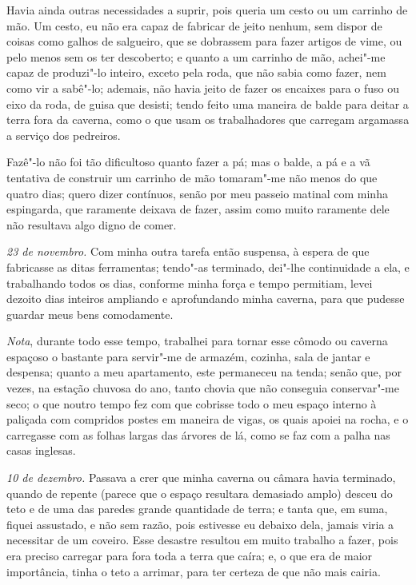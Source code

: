 Havia ainda outras necessidades a suprir, pois queria um cesto ou um
carrinho de mão. Um cesto, eu não era capaz de fabricar de jeito nenhum,
sem dispor de coisas como galhos de salgueiro, que se dobrassem para
fazer artigos de vime, ou pelo menos sem os ter descoberto; e quanto a
um carrinho de mão, achei"-me capaz de produzi"-lo inteiro, exceto pela
roda, que não sabia como fazer, nem como vir a sabê"-lo; ademais, não
havia jeito de fazer os encaixes para o fuso ou eixo da roda, de guisa
que desisti; tendo feito uma maneira de balde para deitar a terra fora
da caverna, como o que usam os trabalhadores que carregam argamassa a
serviço dos pedreiros.

Fazê"-lo não foi tão dificultoso quanto fazer a pá; mas o balde, a pá e a
vã tentativa de construir um carrinho de mão tomaram"-me não menos do que
quatro dias; quero dizer contínuos, senão por meu passeio matinal com
minha espingarda, que raramente deixava de fazer, assim como muito
raramente dele não resultava algo digno de comer.

\emph{23 de novembro.} Com minha outra tarefa então suspensa, à espera
de que fabricasse as ditas ferramentas; tendo"-as terminado, dei"-lhe
continuidade a ela, e trabalhando todos os dias, conforme minha força e
tempo permitiam, levei dezoito dias inteiros ampliando e aprofundando
minha caverna, para que pudesse guardar meus bens comodamente.

\emph{Nota}, durante todo esse tempo, trabalhei para tornar esse cômodo
ou caverna espaçoso o bastante para servir"-me de armazém, cozinha, sala
de jantar e despensa; quanto a meu apartamento, este permaneceu na
tenda; senão que, por vezes, na estação chuvosa do ano, tanto chovia que
não conseguia conservar"-me seco; o que noutro tempo fez com que cobrisse
todo o meu espaço interno à paliçada com compridos postes em maneira de
vigas, os quais apoiei na rocha, e o carregasse com as folhas largas das
árvores de lá, como se faz com a palha nas casas inglesas.

\emph{10 de dezembro.} Passava a crer que minha caverna ou câmara havia
terminado, quando de repente (parece que o espaço resultara demasiado
amplo) desceu do teto e de uma das paredes grande quantidade de terra; e
tanta que, em suma, fiquei assustado, e não sem razão, pois estivesse eu
debaixo dela, jamais viria a necessitar de um coveiro. Esse desastre
resultou em muito trabalho a fazer, pois era preciso carregar para fora
toda a terra que caíra; e, o que era de maior importância, tinha o teto
a arrimar, para ter certeza de que não mais cairia.

